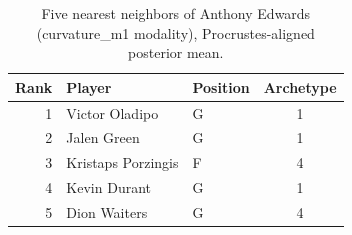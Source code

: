 \begin{table}[htbp]
  \centering\small
  \begin{tabular}{rllc}
    \toprule
    Rank & Player & Position & Archetype \\
    \midrule
    1 & Victor Oladipo & G & 1 \\
    2 & Jalen Green & G & 1 \\
    3 & Kristaps Porzingis & F & 4 \\
    4 & Kevin Durant & G & 1 \\
    5 & Dion Waiters & G & 4 \\
    \bottomrule
  \end{tabular}
  \caption{Five nearest neighbors of Anthony Edwards (curvature_m1 modality), Procrustes-aligned posterior mean.}
  \label{tab:Anthony_Edwards_neighbors_curvature_m1}
\end{table}

